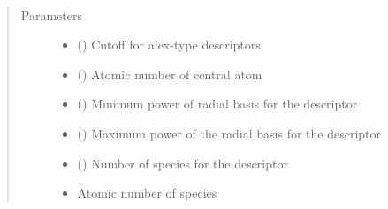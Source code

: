 \documentclass[letterpaper,10pt,english]{sphinxmanual}
\begin{document}
\begin{fulllineitems}
\label{\detokenize{descriptors:gap.descriptors.alex}}~\begin{quote}\begin{description}
\item[{Parameters}] \leavevmode\begin{itemize}
\item {} 
 () \textendash{} Cutoff for alex-type descriptors

\item {} 
 () \textendash{} Atomic number of central atom

\item {} 
 () \textendash{} Minimum power of radial basis for the descriptor

\item {} 
 () \textendash{} Maximum power of the radial basis for the descriptor

\item {} 
 () \textendash{} Number of species for the descriptor

\item {} 
 \textendash{} Atomic number of species

\end{itemize}

\end{description}\end{quote}

\end{fulllineitems}

\end{document}
